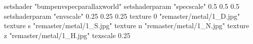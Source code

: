 setshader "bumpenvspecparallaxworld"
setshaderparam "specscale" 0.5 0.5 0.5
setshaderparam "envscale"  0.25 0.25 0.25
    texture 0 "remaster/metal/1_D.jpg"
    texture s "remaster/metal/1_S.jpg"
    texture n "remaster/metal/1_N.jpg"
    texture z "remaster/metal/1_H.jpg"
    texscale 0.25